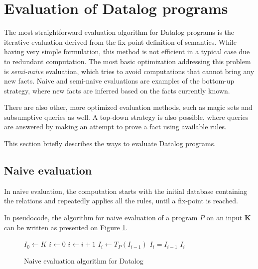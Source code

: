 \section{Evaluation of Datalog programs}
The most straightforward evaluation algorithm for Datalog programs is the iterative evaluation derived from the fix-point definition of semantics. While having very simple formulation, this method is not efficient in a typical case due to redundant computation. The most basic optimization addressing this problem is \emph{semi-naive} evaluation, which tries to avoid computations that cannot bring any new facts. Naive and semi-naive evaluations are examples of the bottom-up strategy, where new facts are inferred based on the facts currently known.

There are also other, more optimized evaluation methods, such as magic sets \cite{magicsets} and subsumptive queries \cite{subsumptivequeries} as well. A top-down strategy \cite{fod, subsumptivequeries} is also possible, where queries are answered by making an attempt to prove a fact using available rules.

This section briefly describes the ways to evaluate Datalog programs.

\subsection{Naive evaluation}\label{ss:datalognaiveeval}
In naive evaluation, the computation starts with the initial database containing the \edb relations and repeatedly applies all the rules, until a fix-point is reached.

In pseudocode, the algorithm for naive evaluation of a program $P$ on an input $\textbf{K}$ can be written as presented on Figure \ref{psc:naiveevaldatalog}.

\begin{figure}[!htbp]
\begin{codebox}
  \li $I_0 \leftarrow K$
  \li $i \leftarrow 0$
  \li \Repeat
  \li $i \leftarrow i + 1$
  \li $I_i \leftarrow T_P(I_{i-1})$
  \li \Until $I_i = I_{i-1}$
  \li \Return $I_i$
\end{codebox}
\caption{Naive evaluation algorithm for Datalog}\label{psc:naiveevaldatalog}
\end{figure}

